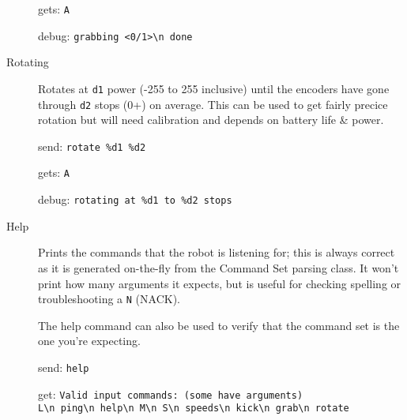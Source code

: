 \begin{description}
  gets: \verb|A|

  debug: \verb|grabbing <0/1>\n done|


\item[Rotating]
  Rotates at \texttt{d1} power (-255 to 255 inclusive) until the encoders have gone through \texttt{d2} stops (0+) on average. This can be used to get fairly precice rotation but will need calibration and depends on battery life \& power.

  send: \verb|rotate %d1 %d2|

  gets: \verb|A|

  debug: \verb|rotating at %d1 to %d2 stops|


\item[Help]
  Prints the commands that the robot is listening for; this is always correct as it is generated on-the-fly from the Command Set parsing class. It won't print how many arguments it expects, but is useful for checking spelling or troubleshooting a \texttt{N} (NACK).

  The help command can also be used to verify that the command set is the one you're expecting.

  send: \verb|help|

  get: \verb|Valid input commands: (some have arguments)|\\
  \verb|L\n ping\n help\n M\n S\n speeds\n kick\n grab\n rotate|

\end{description}
